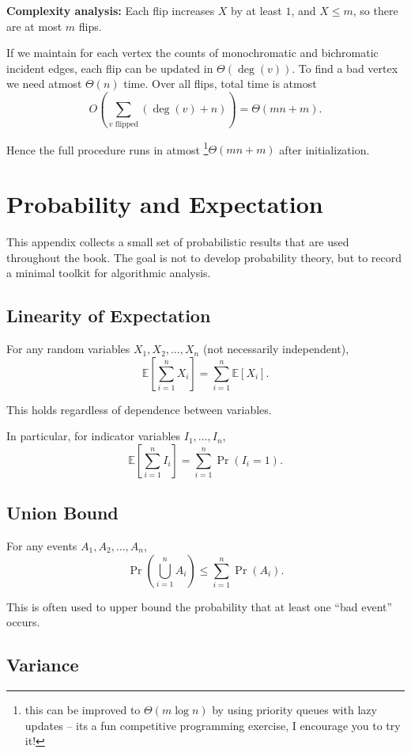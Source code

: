 \documentclass[11pt,openany]{book}
\begin{document}
\noindent\textbf{Complexity analysis:}
Each flip increases $X$ by at least $1$, and $X \le m$, so there are at most $m$ flips.

If we maintain for each vertex the counts of monochromatic and bichromatic incident edges, each flip can be updated in $\Theta(\deg(v))$. To find a bad vertex we need atmost $\Theta(n)$ time. 
Over all flips, total time is atmost
\[
O\left(\sum_{v \text{ flipped}} \left(\deg(v) + n \right) \right) = \Theta(mn+m).
\]

Hence the full procedure runs in atmost \footnote{this can be improved to $\Theta(m\log n)$ by using priority queues with lazy updates -- 
its a fun competitive programming exercise, I encourage you to try it!}$\Theta(mn+m)$ after initialization.


\appendix
{}

\chapter{Probability and Expectation}

This appendix collects a small set of probabilistic results that are used throughout the book. The goal is not to develop probability theory, but to record a minimal toolkit for algorithmic analysis.

\section{Linearity of Expectation}
\label{linearity_of_expectation}
For any random variables $X_1,X_2,\dots,X_n$ (not necessarily independent),
\[
\mathbb{E}\left[\sum_{i=1}^n X_i\right]=\sum_{i=1}^n \mathbb{E}[X_i].
\]

This holds regardless of dependence between variables.

In particular, for indicator variables $I_1,\dots,I_n$,
\[
\mathbb{E}\left[\sum_{i=1}^n I_i\right]=\sum_{i=1}^n \Pr(I_i=1).
\]

\section{Union Bound}
\label{union_bound}
For any events $A_1,A_2,\dots,A_n$,
\[
\Pr\left(\bigcup_{i=1}^n A_i\right)\le \sum_{i=1}^n \Pr(A_i).
\]

This is often used to upper bound the probability that at least one “bad event” occurs.

\section{Variance}
\end{document}
